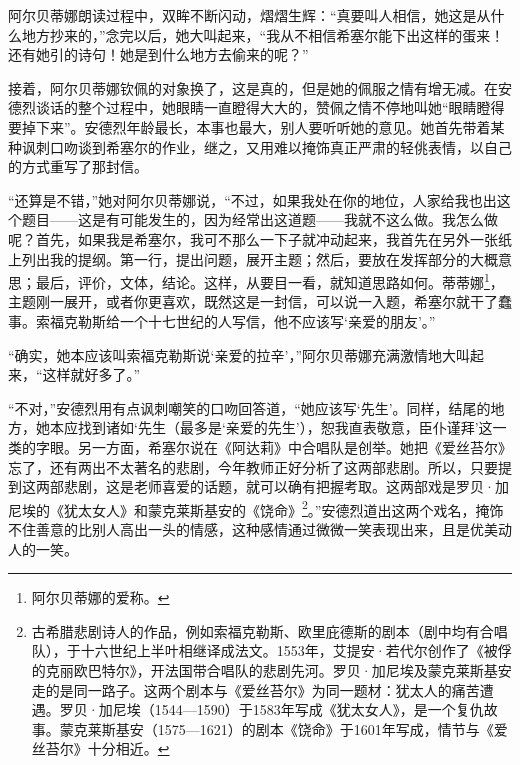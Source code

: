\par 阿尔贝蒂娜朗读过程中，双眸不断闪动，熠熠生辉：“真要叫人相信，她这是从什么地方抄来的，”念完以后，她大叫起来，“我从不相信希塞尔能下出这样的蛋来！还有她引的诗句！她是到什么地方去偷来的呢？”
\par 接着，阿尔贝蒂娜钦佩的对象换了，这是真的，但是她的佩服之情有增无减。在安德烈谈话的整个过程中，她眼睛一直瞪得大大的，赞佩之情不停地叫她“眼睛瞪得要掉下来”。安德烈年龄最长，本事也最大，别人要听听她的意见。她首先带着某种讽刺口吻谈到希塞尔的作业，继之，又用难以掩饰真正严肃的轻佻表情，以自己的方式重写了那封信。
\par “还算是不错，”她对阿尔贝蒂娜说，“不过，如果我处在你的地位，人家给我也出这个题目——这是有可能发生的，因为经常出这道题——我就不这么做。我怎么做呢？首先，如果我是希塞尔，我可不那么一下子就冲动起来，我首先在另外一张纸上列出我的提纲。第一行，提出问题，展开主题；然后，要放在发挥部分的大概意思；最后，评价，文体，结论。这样，从要目一看，就知道思路如何。蒂蒂娜\footnote{阿尔贝蒂娜的爱称。}，主题刚一展开，或者你更喜欢，既然这是一封信，可以说一入题，希塞尔就干了蠢事。索福克勒斯给一个十七世纪的人写信，他不应该写‘亲爱的朋友’。”
\par “确实，她本应该叫索福克勒斯说‘亲爱的拉辛’，”阿尔贝蒂娜充满激情地大叫起来，“这样就好多了。”
\par “不对，”安德烈用有点讽刺嘲笑的口吻回答道，“她应该写‘先生’。同样，结尾的地方，她本应找到诸如‘先生（最多是‘亲爱的先生’），恕我直表敬意，臣仆谨拜’这一类的字眼。另一方面，希塞尔说在《阿达莉》中合唱队是创举。她把《爱丝苔尔》忘了，还有两出不太著名的悲剧，今年教师正好分析了这两部悲剧。所以，只要提到这两部悲剧，这是老师喜爱的话题，就可以确有把握考取。这两部戏是罗贝·加尼埃的《犹太女人》和蒙克莱斯基安的《饶命》\footnote{古希腊悲剧诗人的作品，例如索福克勒斯、欧里庇德斯的剧本（剧中均有合唱队），于十六世纪上半叶相继译成法文。1553年，艾提安·若代尔创作了《被俘的克丽欧巴特尔》，开法国带合唱队的悲剧先河。罗贝·加尼埃及蒙克莱斯基安走的是同一路子。这两个剧本与《爱丝苔尔》为同一题材：犹太人的痛苦遭遇。罗贝·加尼埃（1544—1590）于1583年写成《犹太女人》，是一个复仇故事。蒙克莱斯基安（1575—1621）的剧本《饶命》于1601年写成，情节与《爱丝苔尔》十分相近。}。”安德烈道出这两个戏名，掩饰不住善意的比别人高出一头的情感，这种感情通过微微一笑表现出来，且是优美动人的一笑。
